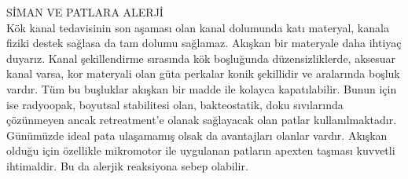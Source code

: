 SİMAN VE PATLARA ALERJİ
\\
Kök kanal tedavisinin son aşaması olan kanal dolumunda katı materyal, kanala fiziki destek sağlasa da tam dolumu sağlamaz. Akışkan bir materyale daha ihtiyaç duyarız. Kanal şekillendirme sırasında kök boşluğunda düzensizliklerde, aksesuar kanal varsa, kor materyali olan güta perkalar konik şekillidir ve aralarında boşluk vardır. Tüm bu buşluklar akışkan bir madde ile kolayca kapatılabilir.  Bunun için ise radyoopak, boyutsal stabilitesi olan, bakteostatik, doku sıvılarında çözünmeyen ancak retreatment’e olanak sağlayacak olan patlar kullanılmaktadır.  Günümüzde ideal pata ulaşamamış olsak da avantajları olanlar vardır. Akışkan olduğu için özellikle mikromotor ile uygulanan patların apexten taşması kuvvetli ihtimaldir. Bu da alerjik reaksiyona sebep olabilir.


